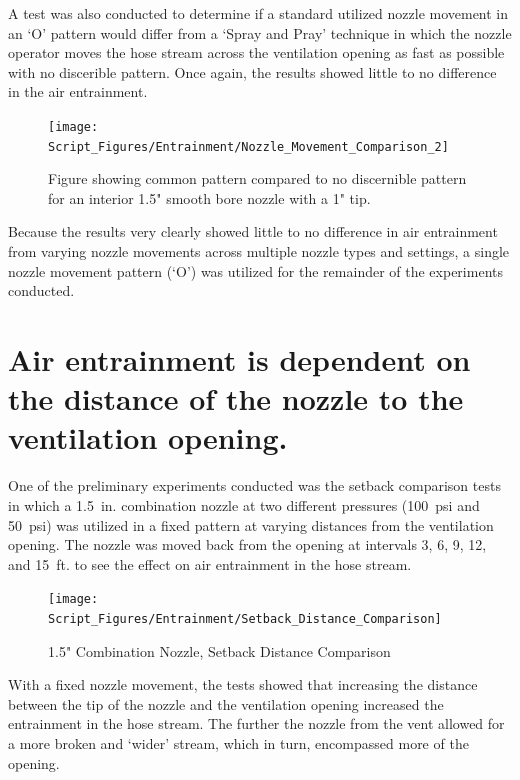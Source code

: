 \documentclass[12pt,oneside]{book}
\begin{document}
\clearpage

A test was also conducted to determine if a standard utilized nozzle movement in an `O' pattern would differ from a `Spray and Pray' technique in which the nozzle operator moves the hose stream across the ventilation opening as fast as possible with no discerible pattern. Once again, the results showed little to no difference in the air entrainment.

\begin{figure}[!ht]
	\centering
	\texttt{[image: Script\_Figures/Entrainment/Nozzle\_Movement\_Comparison\_2]}
	\caption{Figure showing common pattern compared to no discernible pattern for an interior 1.5" smooth bore nozzle with a 1" tip.}
	\label{fig:1_5_Interior_Nozzle_Movement_PatterntoNoPattern_Comparison}
\end{figure}

Because the results very clearly showed little to no difference in air entrainment from varying nozzle movements across multiple nozzle types and settings, a single nozzle movement pattern (`O') was utilized for the remainder of the experiments conducted.

\clearpage

\section{Air entrainment is dependent on the distance of the nozzle to the ventilation opening.} \mbox{}

One of the preliminary experiments conducted was the setback comparison tests in which a 1.5~in. combination nozzle at two different pressures (100~psi and 50~psi) was utilized in a fixed pattern at varying distances from the ventilation opening. The nozzle was moved back from the opening at intervals 3, 6, 9, 12, and 15~ft. to see the effect on air entrainment in the hose stream.

\begin{figure}[!ht]
	\centering
	\texttt{[image: Script\_Figures/Entrainment/Setback\_Distance\_Comparison]}
	\caption{1.5" Combination Nozzle, Setback Distance Comparison}
	\label{fig:1_5_Combination_Nozzle_Setback_Distance_Comparison}
\end{figure}

With a fixed nozzle movement, the tests showed that increasing the distance between the tip of the nozzle and the ventilation opening increased the entrainment in the hose stream. The further the nozzle from the vent allowed for a more broken and `wider' stream, which in turn, encompassed more of the opening.
\end{document}

